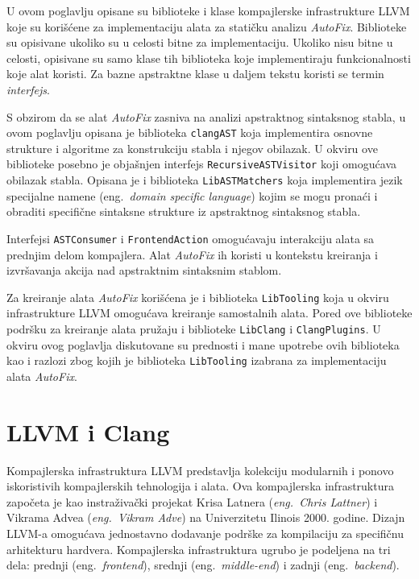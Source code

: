 \documentclass[12pt,oneside]{memoir}
\begin{document}
U ovom poglavlju opisane su biblioteke i klase kompajlerske infrastrukture LLVM koje su kori\v{s}\'{c}ene za implementaciju alata za stati\v{c}ku analizu \textit{AutoFix}. Biblioteke su opisivane ukoliko su u celosti
bitne za implementaciju. Ukoliko nisu bitne u celosti, opisivane su samo klase tih biblioteka koje implementiraju funkcionalnosti koje alat koristi. Za bazne apstraktne klase u daljem tekstu koristi se termin \textit{interfejs}. \par 
S obzirom da se alat \textit{AutoFix} zasniva na analizi apstraktnog sintaksnog stabla, u ovom poglavlju opisana je biblioteka \texttt{clangAST} koja implementira osnovne
strukture i algoritme za konstrukciju stabla i njegov obilazak. U okviru ove biblioteke posebno je obja\v{s}njen interfejs \texttt{RecursiveASTVisitor} koji omogu\'{c}ava obilazak stabla.
Opisana je i biblioteka \texttt{LibASTMatchers} koja implementira jezik specijalne namene (eng.~\textit{domain specific language}) kojim se mogu prona\'{c}i i obraditi specifi\v{c}ne sintaksne strukture iz apstraktnog sintaksnog stabla.
\par
Interfejsi \texttt{ASTConsumer} i \texttt{FrontendAction} omogu\'{c}avaju interakciju alata sa prednjim delom kompajlera. Alat \textit{AutoFix} ih
koristi u kontekstu kreiranja i izvr\v{s}avanja akcija nad apstraktnim sintaksnim
stablom.
\par
Za kreiranje alata \textit{AutoFix} kori\v{s}\'{c}ena je i biblioteka \texttt{LibTooling} koja u okviru infrastrukture LLVM omogu\'{c}ava kreiranje samostalnih alata. Pored ove biblioteke podr\v{s}ku za kreiranje alata pru\v{z}aju i biblioteke
\texttt{LibClang} i \texttt{ClangPlugins}. U okviru ovog poglavlja diskutovane su prednosti i mane upotrebe ovih biblioteka kao i razlozi zbog kojih je biblioteka \texttt{LibTooling} izabrana za implementaciju alata \textit{AutoFix}.

\section{LLVM i Clang}

Kompajlerska infrastruktura LLVM predstavlja kolekciju modularnih i ponovo iskoristivih kompajlerskih tehnologija i alata.
Ova kompajlerska infrastruktura zapo\v{c}eta je kao instraživački projekat Krisa Latnera (\textit{eng.~Chris Lattner}) i Vikrama Advea (\textit{eng.~Vikram Adve}) na Univerzitetu Ilinois 2000. godine.
Dizajn LLVM-a omogu\'{c}ava jednostavno dodavanje podr\v{s}ke za kompilaciju za specifi\v{c}nu arhitekturu hardvera. Kompajlerska infrastruktura
ugrubo je podeljena na tri dela: prednji (eng.~\textit{frontend}), srednji (eng.~\textit{middle-end}) i zadnji (eng.~\textit{backend}). 
\end{document}
